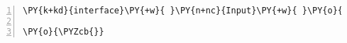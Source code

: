 \begin{Verbatim}[commandchars=\\\{\},numbers=left,firstnumber=1,stepnumber=1,frame=single,fontsize=\small]
\PY{k+kd}{interface}\PY{+w}{ }\PY{n+nc}{Input}\PY{+w}{ }\PY{o}{\PYZob{}}

\PY{o}{\PYZcb{}}
\end{Verbatim}
